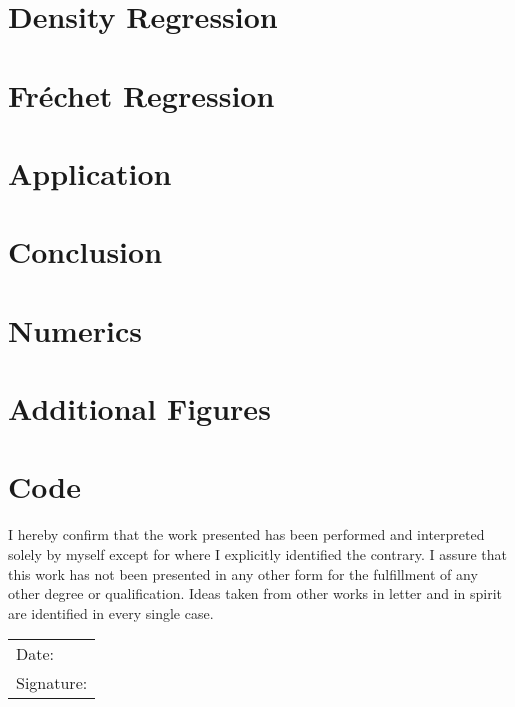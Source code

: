 \documentclass[12pt, a4paper, bibtotoc]{scrartcl}
\theoremstyle{break}
\begin{document}
\section{Density Regression}
\label{sec:density regression}


\section{Fréchet Regression}
\label{sec:fréchet regression}


\section{Application}
\label{sec:Application}


\section{Conclusion}
\label{sec:conclusion}





\newpage
\appendix
{}

\section{Numerics}
\label{sec:numerics}


\section{Additional Figures}
\label{sec:figures}


\section{Code}
\label{sec:code}


\newpage

\nocite{Gaudecker2019}
\printbibliography


\newpage
\thispagestyle{empty}  %
\null\vfill            %
\begin{center}
I hereby confirm that the work presented has been performed and interpreted solely by
myself except for where I explicitly identified the contrary. I assure that this work has
not been presented in any other form for the fulfillment of any other degree or
qualification. Ideas taken from other works in letter and in spirit are identified
in every single case.
\end{center}

\vspace{2cm} %

\begin{flushright}
\begin{tabular}{p{8cm}}
Date: \underline{\hspace{3cm}} \\ [1.0ex]
Signature: \underline{\hspace{3cm}}
\end{tabular}
\end{flushright}

\vfill\null
\newpage
\end{document}
